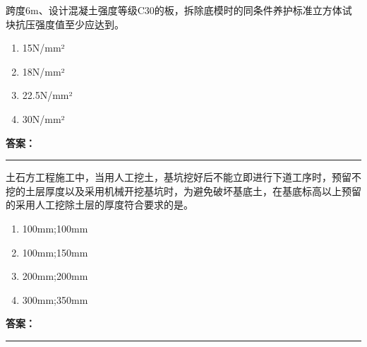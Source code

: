 \documentclass[UTF8,fontset=fandol,11pt]{ctexart}
\newcommand{\answerline}{\textcolor{answerred}{\rule{2.4cm}{0.7pt}}}
\begin{document}
\begin{quizbox}[title={乱序第 97 题｜第四章混凝土结构工程}]

跨度6m、设计混凝土强度等级C30的板，拆除底模时的同条件养护标准立方体试块抗压强度值至少应达到。\\

\begin{enumerate}[label=\Alph*.]

\item 15N/mm²

\item 18N/mm²

\item 22.5N/mm²

\item 30N/mm²

\end{enumerate}

\textbf{\textcolor{answerred}{答案：}} \answerline

\end{quizbox}

\vspace{0.2em}

\begin{quizbox}[title={乱序第 98 题｜第一章土方工程}]

土石方工程施工中，当用人工挖土，基坑挖好后不能立即进行下道工序时，预留不挖的土层厚度以及采用机械开挖基坑时，为避免破坏基底土，在基底标高以上预留的采用人工挖除土层的厚度符合要求的是。\\

\begin{enumerate}[label=\Alph*.]

\item 100mm;100mm

\item 100mm;150mm

\item 200mm;200mm

\item 300mm;350mm

\end{enumerate}

\textbf{\textcolor{answerred}{答案：}} \answerline

\end{quizbox}

\vspace{0.2em}
\end{document}
